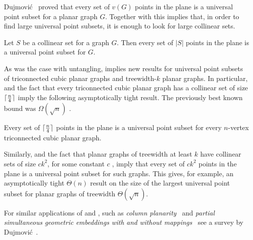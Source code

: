 Dujmovi\'c~\cite{dujmovic:utility}
  proved that every set of $v(G)$ points in the plane is a universal point subset
  for a planar graph $G$. Together with  this implies
  that, in order to find large universal point subsets, it is enough to look for large collinear sets.

\begin{thm}
Let $S$ be a collinear set for a graph $G$. Then every set of $|S|$ points in the
plane is a universal point subset for $G$.
\end{thm}

As was the case with untangling,  implies new results
for universal point subsets of triconnected cubic planar graphs and
treewidth-$k$ planar graphs. In particular,  and the
fact that every triconnected cubic planar graph has a collinear set of
size ${\lceil \frac{n}{4} \rceil}$ \cite{dalozzo.dujmovic.ea:drawing} imply the
following asymptotically tight result. The previously best known bound
was $\Omega(\sqrt{n})$ \cite{dujmovic:utility}.

\begin{cor}
Every set of ${\lceil \frac{n}{4} \rceil}$ points in the plane  is a universal
point subset for  every $n$-vertex triconnected cubic
planar graph.
\end{cor}

Similarly,  and the fact that planar graphs of
treewidth at least $k$ have collinear sets of size $ck^2$, for some
constant $c$ \cite{dalozzo.dujmovic.ea:drawing}, imply that every set
of  $c k^2$ points in the plane is a universal point subset for  such
graphs. This gives, for example, an asymptotically tight  $\Theta(n)$
result on the size of the largest universal point subset for planar
graphs of treewidth $\Theta(\sqrt{n})$. 

For similar applications of 
and , such as \emph{column
planarity}~\cite{behks-cppsge-17,dalozzo.dujmovic.ea:drawing,dujmovic:utility}
and \emph{partial simultaneous geometric embeddings with and without
mappings}~\cite{behks-cppsge-17,ddlmw-pqp-15,dujmovic:utility} see a
survey by Dujmovi\'c~\cite{dujmovic:utility}.



